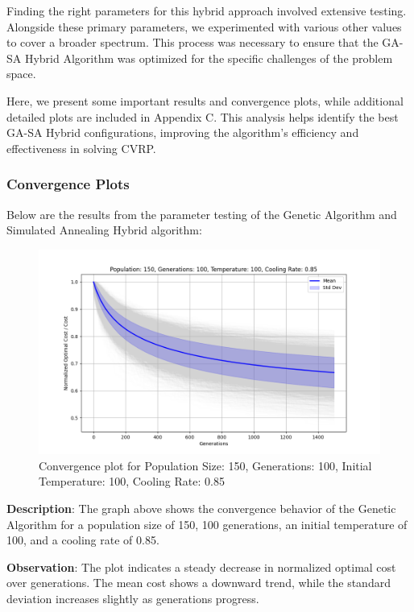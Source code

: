 \documentclass{article}
\begin{document}
    Finding the right parameters for this hybrid approach involved extensive testing. Alongside these primary parameters, we experimented with various other values to cover a broader spectrum. This process was necessary to ensure that the GA-SA Hybrid Algorithm was optimized for the specific challenges of the problem space.

    Here, we present some important results and convergence plots, while additional detailed plots are included in Appendix C. This analysis helps identify the best GA-SA Hybrid configurations, improving the algorithm's efficiency and effectiveness in solving CVRP.

    \subsubsection{Convergence Plots}
    Below are the results from the parameter testing of the Genetic Algorithm and Simulated Annealing Hybrid algorithm:

    \begin{figure}[H]
        \centering
        \includegraphics[width=\textwidth]{genetic_simulated_annealing_hybrid/Population_150_Generations_100_Temperature_100_CoolingRate_0.85}
        \caption{Convergence plot for Population Size: 150, Generations: 100, Initial Temperature: 100, Cooling Rate: 0.85}
        \label{fig:pop150_gen100_temp100_cr0.85}
    \end{figure}

    \textbf{Description}: The graph above shows the convergence behavior of the Genetic Algorithm for a population size of 150, 100 generations, an initial temperature of 100, and a cooling rate of 0.85.

    \textbf{Observation}: The plot indicates a steady decrease in normalized optimal cost over generations. The mean cost shows a downward trend, while the standard deviation increases slightly as generations progress.
\end{document}
